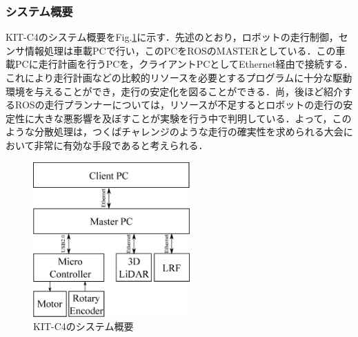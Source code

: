 \documentclass[10pt,a4paper]{jarticle}
\begin{document}
\subsubsection{システム概要}
KIT-C4のシステム概要をFig.\ref{KIT_C4_system}に示す．先述のとおり，ロボットの走行制御，センサ情報処理は車載PCで行い，このPCをROSのMASTERとしている．この車載PCに走行計画を行うPCを，クライアントPCとしてEthernet経由で接続する．これにより走行計画などの比較的リソースを必要とするプログラムに十分な駆動環境を与えることができ，走行の安定化を図ることができる．尚，後ほど紹介するROSの走行プランナーについては，リソースが不足するとロボットの走行の安定性に大きな悪影響を及ぼすことが実験を行う中で判明している．よって，このような分散処理は，つくばチャレンジのような走行の確実性を求められる大会において非常に有効な手段であると考えられる．

\begin{figure}[tbp]
  \centering
  \includegraphics[width=6cm]{fig/eps/KIT_C4_system.eps}
  \caption{KIT-C4のシステム概要}
  \label{KIT_C4_system}
\end{figure}
\end{document}
